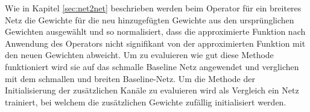 Wie in Kapitel \ref{sec:net2net} beschrieben werden beim Operator für ein breiteres Netz die Gewichte für die neu hinzugefügten Gewichte aus den ursprünglichen Gewichten ausgewählt und so normalisiert, dass die approximierte Funktion nach Anwendung des Operators nicht signifikant von der approximierten Funktion mit den neuen Gewichten abweicht. Um zu evaluieren wie gut diese Methode funktioniert wird sie auf das schmalle Baseline Netz angewendet und verglichen mit dem schmallen und breiten Baseline-Netz. Um die Methode der Initialisierung der zusätzlichen Kanäle zu evaluieren wird als Vergleich ein Netz trainiert, bei welchem die zusätzlichen Gewichte zufällig initialisiert werden.
\begin{figure}
     \centering
     \hfill
     
     \caption{}
     \label{abb:wider}
\end{figure}

